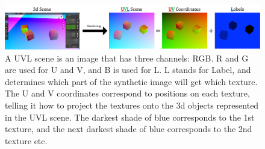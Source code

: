 \documentclass{article}
\begin{document}










\begin{figure}[H]
	\begin{center}
		\includegraphics[width=400pt]{../images/uvl_explanation_minimal.pdf}
	\end{center}
	\caption{
		A UVL scene is an image that has three channels: RGB.
		R and G are used for U and V, and B is used for L.
		L stands for Label, and determines which part of the synthetic image will get which texture.
		The U and V coordinates correspond to positions on each texture,
		telling it how to project the textures onto the 3d objects represented in the UVL scene.
		The darkest shade of blue corresponds to the 1st texture, and the next darkest shade of blue corresponds to the 2nd texture etc.
		}
	\label{fig:uvl_explanation}
\end{figure}
\end{document}
